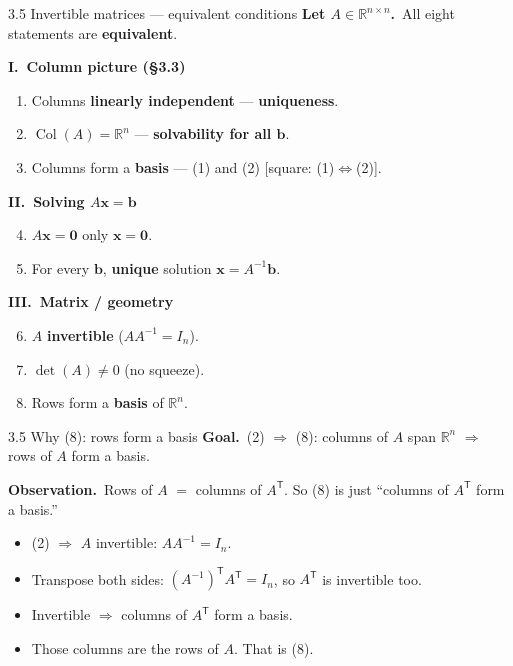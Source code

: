 \documentclass[11pt,aspectratio=169]{beamer}
\begin{document}
\begin{frame}{3.5 Invertible matrices --- equivalent conditions}
  \footnotesize
  \textbf{Let $A\in\mathbb{R}^{n\times n}$.}\
  All eight statements are \textbf{equivalent}.

  \medskip
  {\scriptsize
  \textbf{I.\ Column picture (§3.3)}
  \begin{enumerate}
    \item Columns \textbf{linearly independent} --- \textbf{uniqueness}.
    \item $\operatorname{Col}(A)=\mathbb{R}^n$ --- \textbf{solvability for all $\mathbf{b}$}.
    \item Columns form a \textbf{basis} --- (1) and (2) [square: (1)$\Leftrightarrow$(2)].
  \end{enumerate}

  \textbf{II.\ Solving $A\mathbf{x}=\mathbf{b}$}
  \begin{enumerate}
    \setcounter{enumi}{3}
    \item $A\mathbf{x}=\mathbf{0}$ only $\mathbf{x}=\mathbf{0}$.
    \item For every $\mathbf{b}$, \textbf{unique} solution $\mathbf{x}=A^{-1}\mathbf{b}$.
  \end{enumerate}

  \textbf{III.\ Matrix / geometry}
  \begin{enumerate}
    \setcounter{enumi}{5}
    \item $A$ \textbf{invertible} ($AA^{-1}=I_n$).
    \item $\det(A)\neq 0$ (no squeeze).
    \item Rows form a \textbf{basis} of $\mathbb{R}^n$.
  \end{enumerate}
  }
\end{frame}

\begin{frame}{3.5 Why (8): rows form a basis}
  \footnotesize
  \textbf{Goal.}\
  (2) $\Rightarrow$ (8): columns of $A$ span $\mathbb{R}^n$ $\Rightarrow$ rows of $A$ form a basis.

  \medskip
  \textbf{Observation.}\
  Rows of $A$ $=$ columns of $A^{\mathsf T}$.
  So (8) is just ``columns of $A^{\mathsf T}$ form a basis.''

  \medskip
  \begin{itemize}
    \item (2) $\Rightarrow$ $A$ invertible: $AA^{-1}=I_n$.

    \item Transpose both sides:
      $(A^{-1})^{\mathsf T}A^{\mathsf T}=I_n$, so $A^{\mathsf T}$ is invertible too.

    \item Invertible $\Rightarrow$ columns of $A^{\mathsf T}$ form a basis.

    \item Those columns are the rows of $A$. That is (8).
  \end{itemize}
\end{frame}
\end{document}
